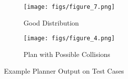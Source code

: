 \begin{figure}[h!]
\centering
\begin{subfigure}[b]{0.48\textwidth}
    \texttt{[image: figs/figure\_7.png]}
    \caption{Good Distribution}
    \label{fig:planner2}
\end{subfigure}
\begin{subfigure}[b]{0.48\textwidth}
    \texttt{[image: figs/figure\_4.png]}
    \caption{Plan with Possible Collisions}
    \label{fig:planner3}
\end{subfigure}        
\caption{Example Planner Output on Test Cases}
\label{fig:more_output}
\end{figure}

\clearpage
